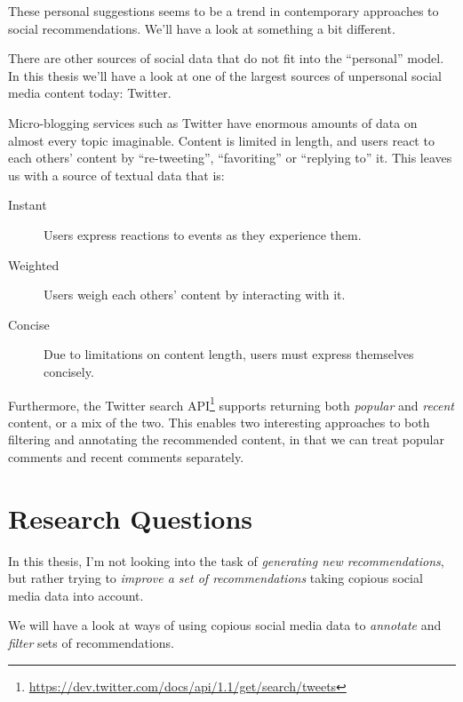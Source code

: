These personal suggestions seems to be a trend in contemporary approaches to social recommendations.
We'll have a look at something a bit different.


There are other sources of social data that do not fit into the ``personal'' model.
In this thesis we'll have a look at one of the largest sources of unpersonal social media content today: Twitter.

Micro-blogging services such as Twitter have enormous amounts of data on almost every topic imaginable.
Content is limited in length, and users react to each others' content by ``re-tweeting'', ``favoriting'' or ``replying to'' it.
This leaves us with a source of textual data that is:

\begin{description}
  \item[Instant] Users express reactions to events as they experience them.
  \item[Weighted] Users weigh each others' content by interacting with it.
  \item[Concise] Due to limitations on content length, users must express themselves concisely.
\end{description}

Furthermore, the Twitter search API\footnote{\url{https://dev.twitter.com/docs/api/1.1/get/search/tweets}} supports returning both \emph{popular} and \emph{recent} content, or a mix of the two.
This enables two interesting approaches to both filtering and annotating the recommended content, in that we can treat popular comments and recent comments separately.


\section{Research Questions}

In this thesis, I'm not looking into the task of \emph{generating new recommendations}, but rather trying to \emph{improve a set of recommendations} taking copious social media data into account.

We will have a look at ways of using copious social media data to \emph{annotate} and \emph{filter} sets of recommendations.

